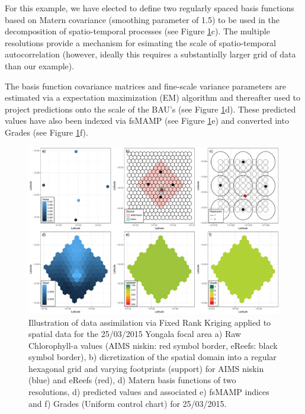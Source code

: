 For this example, we have elected to define two regularly spaced basis functions based on Matern covariance (smoothing parameter of 1.5)
to be used in the decomposition of spatio-temporal processes (see Figure \ref{fig:focalArea_Spatial.Yongala_Measure.chl_Method3}c).
The multiple resolutions provide a mechanism
for esimating the scale of spatio-temporal autocorrelation (however, ideally this requires a substantially
larger grid of data than our example).

The basis function covariance matrices and fine-scale variance parameters are estimated via a expectation maximization (EM)
algorithm and thereafter used to project predictions onto the scale of the BAU's (see Figure \ref{fig:focalArea_Spatial.Yongala_Measure.chl_Method3}d).
These predicted values have also been indexed via fsMAMP (see Figure \ref{fig:focalArea_Spatial.Yongala_Measure.chl_Method3}e) and
converted into Grades (see Figure \ref{fig:focalArea_Spatial.Yongala_Measure.chl_Method3}f).

\begin{figure}[!hptb]
  \includegraphics[width=\textwidth]{figures/FocalAreas/focalArea_Spatial.Yongala_Measure.chl_Method3.pdf}
    \caption{Illustration of data assimilation via Fixed Rank Kriging applied to spatial data for the 25/03/2015 Yongala focal area a) Raw Chlorophyll-a values (AIMS niskin: red symbol border, eReefs: black symbol border), b) dicretization of the spatial domain into a regular hexagonal grid and varying footprints (support) for AIMS niskin (blue) and eReefs (red), d) Matern basis functions of two resolutions, d) predicted values and associated e) fsMAMP indices and f) Grades (Uniform control chart) for 25/03/2015.}\label{fig:focalArea_Spatial.Yongala_Measure.chl_Method3}
\end{figure}

